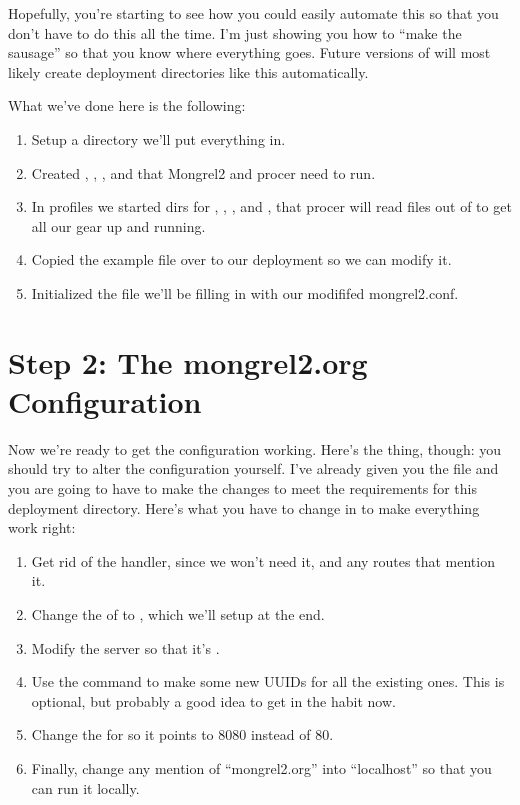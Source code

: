 Hopefully, you're starting to see how you could easily automate this so that you don't
have to do this all the time.  I'm just showing you how to ``make the sausage'' so that
you know where everything goes.  Future versions of  will most likely
create deployment directories like this automatically.

What we've done here is the following:

\begin{enumerate}
  \item Setup a  directory we'll put everything in.
  \item Created , , , and  that Mongrel2 and procer need to run.
  \item In profiles we started dirs for , , ,  and ,
    that procer will read files out of to get all our gear up and running.
  \item Copied the  example file over to our deployment so we can modify it.
  \item Initialized the  file we'll be filling in with our modififed mongrel2.conf.
\end{enumerate}


\section{Step 2: The mongrel2.org Configuration}

Now we're ready to get the configuration working.  Here's the thing, though: you should
try to alter the configuration yourself.  I've already given you the file and you are
going to have to make the changes to meet the requirements for this deployment directory.
Here's what you have to change in  to make everything work right:

\begin{enumerate}
\item Get rid of the  handler, since we won't need it, and
    any routes that mention it.
\item Change the  of  to , which we'll setup at the end.
\item Modify the server  so that it's .
\item Use the  command to make some new UUIDs for all the
    existing ones.  This is optional, but probably a good idea to get in the
    habit now.
\item Change the  for  so it points to 8080 instead of 80.
\item Finally, change any mention of ``mongrel2.org'' into ``localhost'' so that you
    can run it locally.
\end{enumerate}


